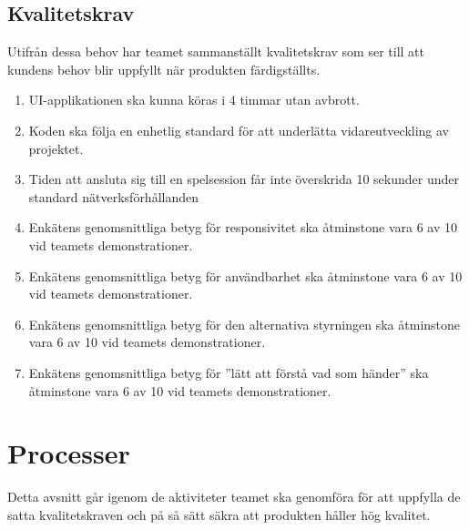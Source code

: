 \documentclass[10pt]{article}
\begin{document}
	\subsection{Kvalitetskrav}
	Utifrån dessa behov har teamet sammanställt kvalitetskrav som ser till att kundens behov blir uppfyllt när produkten färdigställts.
	\begin{enumerate}
		\item UI-applikationen ska kunna köras i 4 timmar utan avbrott.
		\item Koden ska följa en enhetlig standard för att underlätta vidareutveckling av projektet.
		\item Tiden att ansluta sig till en spelsession får inte överskrida 10 sekunder under standard nätverksförhållanden
		\item Enkätens genomsnittliga betyg för responsivitet ska åtminstone vara 6 av 10 vid teamets demonstrationer.
		\item Enkätens genomsnittliga betyg för användbarhet ska åtminstone vara 6 av 10 vid teamets demonstrationer.
		\item Enkätens genomsnittliga betyg för den alternativa styrningen ska åtminstone vara 6 av 10 vid teamets demonstrationer.
		\item Enkätens genomsnittliga betyg för ''lätt att förstå vad som händer'' ska åtminstone vara 6 av 10 vid teamets demonstrationer.
		
	\end{enumerate}

\pagebreak
\section{Processer}
	Detta avsnitt går igenom de aktiviteter teamet ska genomföra för att uppfylla de satta kvalitetskraven och på så sätt säkra att produkten håller hög kvalitet.
\end{document}
